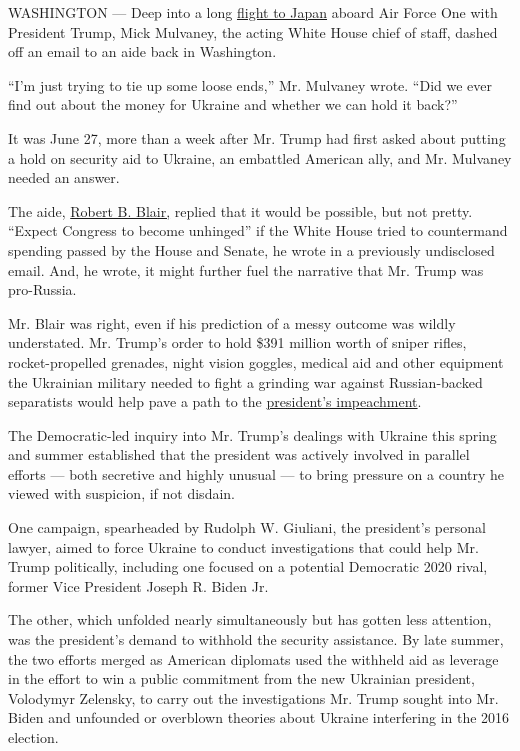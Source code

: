 WASHINGTON --- Deep into a long
\href{https://www.nytimes.com/2019/06/27/world/asia/trump-g20.html}{flight
to Japan} aboard Air Force One with President Trump, Mick Mulvaney, the
acting White House chief of staff, dashed off an email to an aide back
in Washington.

``I'm just trying to tie up some loose ends,'' Mr. Mulvaney wrote. ``Did
we ever find out about the money for Ukraine and whether we can hold it
back?''

It was June 27, more than a week after Mr. Trump had first asked about
putting a hold on security aid to Ukraine, an embattled American ally,
and Mr. Mulvaney needed an answer.

The aide,
\href{https://projects.propublica.org/trump-town/staffers/robert-b-blair-white-house-office}{Robert
B. Blair,} replied that it would be possible, but not pretty. ``Expect
Congress to become unhinged'' if the White House tried to countermand
spending passed by the House and Senate, he wrote in a previously
undisclosed email. And, he wrote, it might further fuel the narrative
that Mr. Trump was pro-Russia.

Mr. Blair was right, even if his prediction of a messy outcome was
wildly understated. Mr. Trump's order to hold \$391 million worth of
sniper rifles, rocket-propelled grenades, night vision goggles, medical
aid and other equipment the Ukrainian military needed to fight a
grinding war against Russian-backed separatists would help pave a path
to the
\href{https://www.nytimes.com/2019/12/18/us/politics/trump-impeached.html?action=click\&pgtype=Article\&state=default\&module=STYLN_trump_playbook\&variant=1_trump_playbook\&region=header\&context=menu}{president's
impeachment}.

The Democratic-led inquiry into Mr. Trump's dealings with Ukraine this
spring and summer established that the president was actively involved
in parallel efforts --- both secretive and highly unusual --- to bring
pressure on a country he viewed with suspicion, if not disdain.

One campaign, spearheaded by Rudolph W. Giuliani, the president's
personal lawyer, aimed to force Ukraine to conduct investigations that
could help Mr. Trump politically, including one focused on a potential
Democratic 2020 rival, former Vice President Joseph R. Biden Jr.

The other, which unfolded nearly simultaneously but has gotten less
attention, was the president's demand to withhold the security
assistance. By late summer, the two efforts merged as American diplomats
used the withheld aid as leverage in the effort to win a public
commitment from the new Ukrainian president, Volodymyr Zelensky, to
carry out the investigations Mr. Trump sought into Mr. Biden and
unfounded or overblown theories about Ukraine interfering in the 2016
election.

